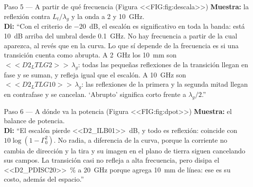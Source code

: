 \documentclass[11pt,letterpaper]{article}
\begin{document}
\begin{paso}{Paso 5 --- A partir de qué frecuencia (Figura <<FIG:fig:descala>>)}
\textbf{Muestra:} la reflexión contra $L_t/\lambda_g$ y la onda a 2 y \SI{10}{GHz}.\\
\textbf{Di:} ``Con el criterio de $-20$~dB, el escalón es significativo en toda la banda: está 10~dB arriba del umbral desde \SI{0.1}{GHz}. No hay frecuencia a partir de la cual aparezca, al revés que en la curva. Lo que sí depende de la frecuencia es si una transición cuenta como abrupta. A \SI{2}{GHz} los \SI{10}{mm} son $<<D2_LTLG2>>\,\lambda_g$: todas las pequeñas reflexiones de la transición llegan en fase y se suman, y refleja igual que el escalón. A \SI{10}{GHz} son $<<D2_LTLG10>>\,\lambda_g$: las reflexiones de la primera y la segunda mitad llegan en contrafase y se cancelan. `Abrupto' significa corto frente a $\lambda_g/2$.''
\end{paso}

\begin{paso}{Paso 6 --- A dónde va la potencia (Figura <<FIG:fig:dpot>>)}
\textbf{Muestra:} el balance de potencia.\\
\textbf{Di:} ``El escalón pierde \SI{<<D2_ILB01>>}{dB}, y todo es reflexión: coincide con $10\log(1-\Gamma_0^2)$. No radia, a diferencia de la curva, porque la corriente no cambia de dirección y la tira y su imagen en el plano de tierra siguen cancelando sus campos. La transición casi no refleja a alta frecuencia, pero disipa el \SI{<<D2_PDISC20>>}{\percent} a \SI{20}{GHz} porque agrega \SI{10}{mm} de línea: ese es su costo, además del espacio.''
\end{paso}
\end{document}
